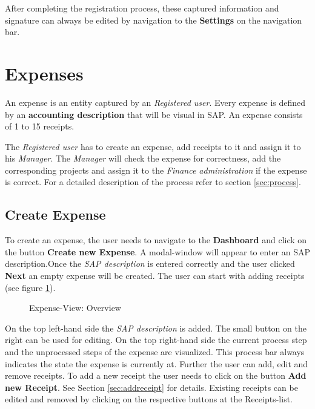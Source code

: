 After completing the registration process, these captured information and signature can always be edited by navigation to the \textbf{Settings} on the navigation bar.
\clearpage

\section{Expenses}

An expense is an entity captured by an \textit{Registered user}. Every expense is defined by an \textbf{accounting description} that will be visual in SAP. An expense consists of 1 to 15 receipts.

The \textit{Registered user} has to create an expense, add receipts to it and assign it to his \textit{Manager}. The \textit{Manager} will check the expense for correctness, add the corresponding projects and assign it to the \textit{Finance administration} if the expense is correct. For a detailed description of the process refer to section \ref{sec:process}.

\subsection{Create Expense}

To create an expense, the user needs to navigate to the \textbf{Dashboard} and click on the button \textbf{Create new Expense}. A modal-window will appear to enter an SAP description.\newline Once the \textit{SAP description} is entered correctly and the user clicked \textbf{Next} an empty expense will be created. The user can start with adding receipts (see figure \ref{fig:expensesitems-overview}).

\begin{figure}[H]
    \centering
    \caption{Expense-View: Overview}
    \label{fig:expensesitems-overview}
\end{figure}

On the top left-hand side the \textit{SAP description} is added. The small button on the right can be used for editing. On the top right-hand side the current process step and the unprocessed steps of the expense are visualized. This process bar always indicates the state the expense is currently at.\newline
Further the user can add, edit and remove receipts. To add a new receipt the user needs to click on the button \textbf{Add new Receipt}. See Section \ref{sec:addreceipt} for details.\newline
Existing receipts can be edited and removed by clicking on the respective buttons at the Receipts-list.


